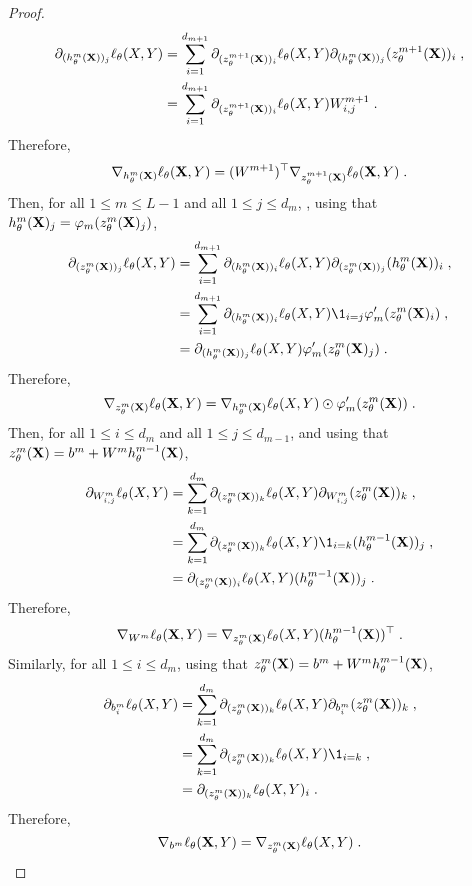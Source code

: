 \begin{proof}
\begin{align*}
\partial_{(h_{\theta}^m(\mathbf{X}))_j}\ell_{\theta}(X,Y) &=  \sum_{i=1}^{d_{m+1}} \partial_{(z_{\theta}^{m+1}(\mathbf{X}))_i}\ell_{\theta}(X,Y)\partial_{(h_{\theta}^m(\mathbf{X}))_j}(z_{\theta}^{m+1}(\mathbf{X}))_i\;,\\
&=  \sum_{i=1}^{d_{m+1}} \partial_{(z_{\theta}^{m+1}(\mathbf{X}))_i}\ell_{\theta}(X,Y)W^{m+1}_{i,j}\;.
\end{align*}
Therefore,
$$
\nabla_{h_{\theta}^m(\mathbf{X})} \ell_{\theta}(\mathbf{X},Y) = (W^{m+1})^\top\nabla_{z_{\theta}^{m+1}(\mathbf{X})} \ell_{\theta}(\mathbf{X},Y) \;.
$$
Then, for all $1\leqslant m \leqslant L-1$ and all $1\leqslant j \leqslant d_m$, ,  using that $h_{\theta}^{m}(\mathbf{X})_j =\varphi_m(z_{\theta}^{m}(\mathbf{X})_j)$,
\begin{align*}
\partial_{(z_{\theta}^m(\bX))_j}\ell_{\theta}(X,Y) &=  \sum_{i=1}^{d_{m+1}} \partial_{(h_{\theta}^m(\bX))_i}\ell_{\theta}(X,Y)\partial_{(z_{\theta}^m(\bX))_j}(h_{\theta}^m(\bX))_i\eqsp,\\
&=  \sum_{i=1}^{d_{m+1}} \partial_{(h_{\theta}^m(\bX))_i}\ell_{\theta}(X,Y) \1_{i=j}\varphi_m'(z_{\theta}^{m}(\bX)_i)\eqsp,\\
&= \partial_{(h_{\theta}^m(\bX))_j}\ell_{\theta}(X,Y) \varphi_m'(z_{\theta}^{m}(\bX)_j)\eqsp.
\end{align*}
Therefore,
$$
\nabla_{z_{\theta}^m(\mathbf{X})} \ell_{\theta}(\mathbf{X},Y) = \nabla_{h_{\theta}^m(\mathbf{X})}\ell_{\theta}(X,Y) \odot \varphi_m'(z_{\theta}^{m}(\mathbf{X}))\;.
$$
Then, for all $1\leqslant i\leqslant d_m$ and all $1\leqslant j \leqslant d_{m-1}$, and using that $z_{\theta}^m(\mathbf{X}) = b^m + W^mh_{\theta}^{m-1}(\mathbf{X})$,
\begin{align*}
\partial_{W^m_{i,j}}\ell_{\theta}(X,Y) &=  \sum_{k=1}^{d_m} \partial_{(z_{\theta}^m(\bX))_k}\ell_{\theta}(X,Y)\partial_{W^m_{i,j}}(z_{\theta}^m(\bX))_k\eqsp,\\
&=  \sum_{k=1}^{d_m} \partial_{(z_{\theta}^m(\bX))_k}\ell_{\theta}(X,Y)\1_{i=k}(h_{\theta}^{m-1}(\bX))_j\eqsp,\\
&=  \partial_{(z_{\theta}^m(\bX))_i}\ell_{\theta}(X,Y)(h_{\theta}^{m-1}(\bX))_j\eqsp.
\end{align*}
Therefore,
$$
\nabla_{W^m} \ell_{\theta}(\mathbf{X},Y) = \nabla_{z_{\theta}^m(\mathbf{X})}\ell_{\theta}(X,Y)(h_{\theta}^{m-1}(\mathbf{X}))^\top\;.
$$
Similarly, for all $1\leqslant i\leqslant d_m$,  using that $z_{\theta}^m(\mathbf{X}) = b^m + W^mh_{\theta}^{m-1}(\mathbf{X})$,
\begin{align*}
\partial_{b^m_{i}}\ell_{\theta}(X,Y) &=  \sum_{k=1}^{d_m} \partial_{(z_{\theta}^m(\bX))_k}\ell_{\theta}(X,Y)\partial_{b^m_{i}}(z_{\theta}^m(\bX))_k\eqsp,\\
&=  \sum_{k=1}^{d_m} \partial_{(z_{\theta}^m(\bX))_k}\ell_{\theta}(X,Y)\1_{i=k}\eqsp,\\
&=  \partial_{(z_{\theta}^m(\bX))_k}\ell_{\theta}(X,Y)_i\eqsp.
\end{align*}
Therefore,
$$
\nabla_{b^m} \ell_{\theta}(\mathbf{X},Y) =  \nabla_{z_{\theta}^m(\mathbf{X})}\ell_{\theta}(X,Y)\;.
$$
\end{proof}
